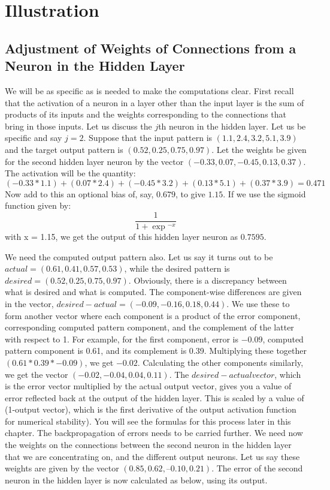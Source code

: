 \documentclass[12pt, right open]{memoir}
\begin{document}
\section{Illustration}
\subsection{Adjustment of Weights of Connections from a Neuron in
the Hidden Layer}

We will be as specific as is needed to make the computations clear. First recall that the activation of a neuron in a layer other than the input layer is the sum of products of its inputs and the weights corresponding to the connections that bring in those inputs. Let us discuss the $j$th neuron in the hidden layer. Let us be specific and say $j = 2$. Suppose that the input pattern is $(1.1, 2.4, 3.2, 5.1, 3.9)$ and the target output pattern is $(0.52, 0.25, 0.75, 0.97)$. Let the weights be given for the second hidden layer
neuron by the vector $(-0.33, 0.07, -0.45, 0.13, 0.37)$. The activation will be the quantity:\\

$(-0.33 * 1.1) + (0.07 * 2.4) + (-0.45 * 3.2) + (0.13 * 5.1)
+ (0.37 * 3.9) = 0.471$\\

Now add to this an optional bias of, say, $0.679$, to give $1.15$. 
If we use the sigmoid function given by:
\[
 \frac{1}{1+\exp{^{-x}}}
\]
with x = 1.15, we get the output of this hidden layer neuron as $0.7595$.

We need the computed output pattern also. Let us say it turns out to be $actual = (0.61, 0.41, 0.57, 0.53)$, while the desired pattern is $desired = (0.52, 0.25, 0.75, 0.97)$. Obviously, there is a discrepancy between what is desired and what is computed. The component-wise differences are given in the vector, $desired - actual = (-0.09, -0.16, 0.18, 0.44)$. We use these to form another vector where each component is a product of the error component, corresponding computed pattern component, and the complement of the latter with respect to 1. For example, for the first component, error is $-0.09$, computed pattern component is 0.61, and its complement is 0.39. Multiplying these together $(0.61*0.39*-0.09)$, we get $-0.02$. Calculating the other components similarly, we get the vector $(-0.02, -0.04, 0.04, 0.11)$. The $desired-actual vector$, which is the error vector multiplied by the actual output vector, gives you a value of error reflected back at the output of the hidden layer. This is scaled by a value of (1-output vector), which is the first derivative of the output activation function for numerical stability). You will see the
formulas for this process later in this chapter. The backpropagation of errors needs to be carried further. We need now the weights on the connections between the second neuron in the hidden layer that we are concentrating on, and the different output neurons. Let us say these weights are given by the vector $(0.85, 0.62, –0.10, 0.21)$. The error of the second neuron in the hidden layer is now calculated as below, using its output.\\
\end{document}
